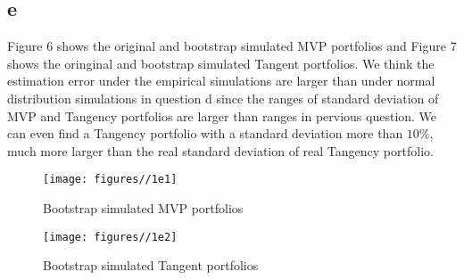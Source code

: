 \documentclass{report}
\begin{document}
\subsection{e}
Figure 6 shows the original and bootstrap simulated MVP portfolios and Figure 7 shows the oringinal and bootstrap simulated Tangent portfolios. We think the estimation error under the empirical simulations are larger than under normal distribution simulations in question d since the ranges of standard deviation of MVP and Tangency portfolios are larger than ranges in pervious question. We can even find a Tangency portfolio with a standard deviation more than $10\%$, much more larger than the real standard deviation of real Tangency portfolio.
\begin{figure}[H]
        \centering 
         \texttt{[image: figures//1e1]}
         \caption{ Bootstrap simulated MVP portfolios}
\end{figure}
\begin{figure}[H]
        \centering 
         \texttt{[image: figures//1e2]}
         \caption{ Bootstrap simulated Tangent portfolios}
\end{figure}
\end{document}
